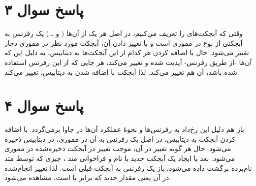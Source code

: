 \documentclass{article}
\begin{document}
\section*{پاسخ سوال ۳}
وقتی که آبجکت‌های  را تعریف می‌کنیم، در اصل هر یک از آن‌ها ( و …) یک رفرنس به آبجکتی از نوع  در مموری است و با تغییر دادن آن، آبجکت مورد نظر در مموری دچار تغییر می‌شود. حال با اضافه کردن هر کدام از این آبجکت‌ها به دیتابیس، به دلیل این که  آن‌ها -از طریق رفرنس- آپدیت شده و تغییر می‌کند، هر جایی که از این رفرنس استفاده شده باشد، آن هم تغییر می‌کند. لذا  آبجکت  با اضافه شدن به دیتابیس، تغییر می‌کند.

\section*{پاسخ سوال ۴}
باز هم دلیل این رخ‌داد به رفرنس‌ها و نحوۀ عملکرد آن‌ها در جاوا برمی‌گردد. با اضافه کردن آبجکت  به دیتابیس، در اصل یک رفرنس به آن در مموری، در دیتابیس ذخیره می‌شود. حال هر گونه تغییر در آن، موجب تغییر در آبجکت ذخیره‌شده در مموری می‌شود. بعد با ایجاد یک آبجکت جدید با نام  و فراخوانی متد ، چیزی که توسط متد نام‌برده برگشت داده می‌شود، باز یک رفرنس به آبجکت قبلی است. لذا تغییر انجام‌شده در آن یعنی مقدار جدید  که برابر با  است، مشاهده می‌شود.
\end{document}
